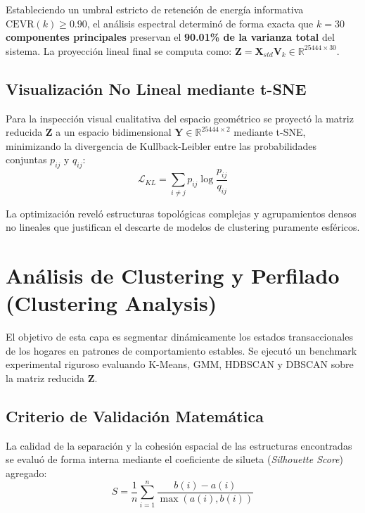 \documentclass[11pt,a4paper]{article}
\begin{document}
Estableciendo un umbral estricto de retención de energía informativa $\text{CEVR}(k) \ge 0.90$, el análisis espectral determinó de forma exacta que \textbf{$k = 30$ componentes principales} preservan el \textbf{90.01\% de la varianza total} del sistema. La proyección lineal final se computa como: $\mathbf{Z} = \mathbf{X}_{std} \mathbf{V}_k \in \mathbb{R}^{25444 \times 30}$.

\subsection{Visualización No Lineal mediante t-SNE}
Para la inspección visual cualitativa del espacio geométrico se proyectó la matriz reducida $\mathbf{Z}$ a un espacio bidimensional $\mathbf{Y} \in \mathbb{R}^{25444 \times 2}$ mediante t-SNE, minimizando la divergencia de Kullback-Leibler entre las probabilidades conjuntas $p_{ij}$ y $q_{ij}$:
\begin{equation}
\mathcal{L}_{KL} = \sum_{i \neq j} p_{ij} \log \frac{p_{ij}}{q_{ij}}
\end{equation}

La optimización reveló estructuras topológicas complejas y agrupamientos densos no lineales que justifican el descarte de modelos de clustering puramente esféricos.

\section{Análisis de Clustering y Perfilado (Clustering Analysis)}
El objetivo de esta capa es segmentar dinámicamente los estados transaccionales de los hogares en patrones de comportamiento estables. Se ejecutó un benchmark experimental riguroso evaluando K-Means, GMM, HDBSCAN y DBSCAN sobre la matriz reducida $\mathbf{Z}$.

\subsection{Criterio de Validación Matemática}
La calidad de la separación y la cohesión espacial de las estructuras encontradas se evaluó de forma interna mediante el coeficiente de silueta (\textit{Silhouette Score}) agregado:
\begin{equation}
S = \frac{1}{n} \sum_{i=1}^n \frac{b(i) - a(i)}{\max(a(i), b(i))}
\end{equation}
\end{document}
